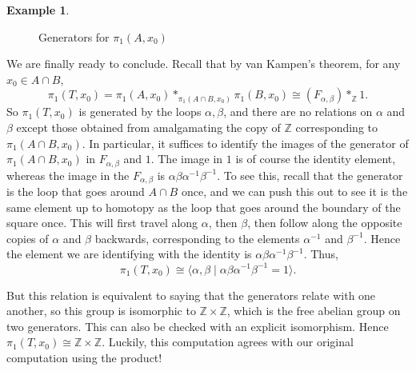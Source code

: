 \documentclass{article}
\theoremstyle{definition}
\newtheorem{exa}[thm]{Example}
\theoremstyle{remark}
\newcommand{\Z}{\mathbb Z}
\numberwithin{figure}{section}
\begin{document}
\begin{exa}
	\begin{figure}[h]
		\centering
		\caption{Generators for $\pi_1(A, x_0)$}
		\label{fig:generating fundgrp of A}
	\end{figure}
	
	We are finally ready to conclude. Recall that by van Kampen's theorem, for any $x_0 \in A \cap B$,
	\[
	\pi_1(T, x_0) = \pi_1(A, x_0) *_{\pi_1(A \cap B, x_0)} \pi_1(B, x_0) \cong (F_{\alpha, \beta}) *_{\Z} 1.
	\]
	So $\pi_1(T, x_0)$ is generated by the loops $\alpha, \beta$, and there are no relations on $\alpha$ and $\beta$ except those obtained from amalgamating the copy of $\Z$ corresponding to $\pi_1(A \cap B, x_0)$. In particular, it suffices to identify the images of the generator of $\pi_1(A \cap B, x_0)$ in $F_{\alpha, \beta}$ and $1$. The image in $1$ is of course the identity element, whereas the image in the $F_{\alpha, \beta}$ is $\alpha\beta\alpha^{-1}\beta^{-1}$. To see this, recall that the generator is the loop that goes around $A \cap B$ once, and we can push this out to see it is the same element up to homotopy as the loop that goes around the boundary of the square once. This will first travel along $\alpha$, then $\beta$, then follow along the opposite copies of $\alpha$ and $\beta$ backwards, corresponding to the elements $\alpha^{-1}$ and $\beta^{-1}$. Hence the element we are identifying with the identity is $\alpha\beta\alpha^{-1}\beta^{-1}$. Thus,
	\[
	\pi_1(T, x_0) \cong \langle \alpha, \beta \mid \alpha\beta\alpha^{-1}\beta^{-1} = 1 \rangle.
	\]
	
	But this relation is equivalent to saying that the generators relate with one another, so this group is isomorphic to $\Z \times \Z$, which is the free abelian group on two generators. This can also be checked with an explicit isomorphism. Hence $\pi_1(T, x_0) \cong \Z \times \Z$. Luckily, this computation agrees with our original computation using the product!
\end{exa}
\end{document}
